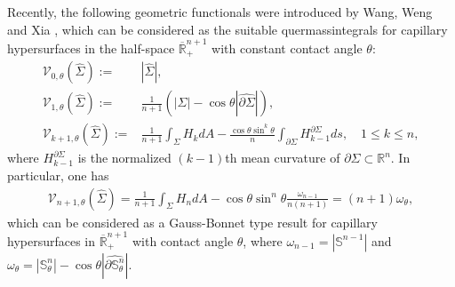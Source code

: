 \documentclass[11pt,reqno]{amsart}
\theoremstyle{definition}
\theoremstyle{remark}
\numberwithin{equation}{section}
\renewcommand{\(}{\left(}
\renewcommand{\)}{\right)}
\renewcommand{\-}{\overline}
\renewcommand{\t}{\theta}
\begin{document}
Recently, the following geometric functionals were introduced by Wang, Weng and Xia \cite{Wang-Weng-Xia2022}, which can be considered as the suitable quermassintegrals for capillary hypersurfaces in the half-space $\-{\mathbb{R}}^{n+1}_{+}$ with constant contact angle $\t$:
\begin{align}\label{s1:quermassintegral-capillary}
\mathcal{V}_{0,\t}(\widehat{\Sigma}):=&|\widehat{\Sigma}|, \nonumber\\
\mathcal{V}_{1,\t}(\widehat{\Sigma}):=&\frac{1}{n+1}(|\Sigma|-\cos \t |\widehat{\partial \Sigma}|), \nonumber\\
\mathcal{V}_{k+1,\t}(\widehat{\Sigma}):=&\frac{1}{n+1}\int_{\Sigma}H_k dA-\frac{\cos\t \sin^k\t}{n}\int_{\partial \Sigma}H_{k-1}^{\partial\Sigma}ds, \quad 1\leq k\leq n,
\end{align}
where $H_{k-1}^{\partial \Sigma}$ is the normalized $(k-1)$th mean curvature of $\partial \Sigma \subset \mathbb R^n$. In particular, one has
\begin{align*}
\mathcal{V}_{n+1,\t}(\widehat{\Sigma})=\frac{1}{n+1}\int_{\Sigma}H_ndA-\cos\t \sin^n\t \frac{\omega_{n-1}}{n(n+1)}=(n+1)\omega_\t,
\end{align*}
which can be considered as a Gauss-Bonnet type result for capillary hypersurfaces in $\-{\mathbb{R}}^{n+1}_{+}$  with contact angle $\t$, where $\omega_{n-1}=|\mathbb{S}^{n-1}|$ and $\omega_\theta=|\mathbb S^n_{\theta}|-\cos\theta|\widehat{\partial \mathbb{S}^n_\theta}|$.
\end{document}
